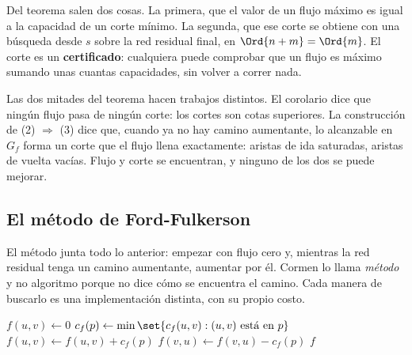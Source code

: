 \documentclass[11pt,letterpaper]{article}
\begin{document}
Del teorema salen dos cosas. La primera, que el valor de un flujo
máximo es igual a la capacidad de un corte mínimo. La segunda, que ese
corte se obtiene con una búsqueda desde $s$ sobre la red residual
final, en $\Ord{n + m} = \Ord{m}$. El corte es un
\textbf{certificado}: cualquiera puede comprobar que un flujo es
máximo sumando unas cuantas capacidades, sin volver a correr nada.

\begin{idea}
  Las dos mitades del teorema hacen trabajos distintos. El corolario
  dice que ningún flujo pasa de ningún corte: los cortes son cotas
  superiores. La construcción de (2) $\Rightarrow$ (3) dice que,
  cuando ya no hay camino aumentante, lo alcanzable en $G_f$ forma un
  corte que el flujo llena exactamente: aristas de ida saturadas,
  aristas de vuelta vacías. Flujo y corte se encuentran, y ninguno de
  los dos se puede mejorar.
\end{idea}


\subsection*{El método de Ford-Fulkerson}

El método junta todo lo anterior: empezar con flujo cero y, mientras
la red residual tenga un camino aumentante, aumentar por él. Cormen lo
llama \emph{método} y no algoritmo porque no dice cómo se encuentra el
camino. Cada manera de buscarlo es una implementación distinta, con su
propio costo.

\begin{algorithm}[H]
\caption{\textsc{Ford-Fulkerson}$(G, s, t)$}
\label{alg:ford-fulkerson}
\begin{algorithmic}[1]
    \State $f(u, v) \gets 0$
  \EndFor
    \State $c_f(p) \gets \min\set{c_f(u, v) : (u, v) \text{ está en }
           p}$
        \State $f(u, v) \gets f(u, v) + c_f(p)$
      \Else
        \State $f(v, u) \gets f(v, u) - c_f(p)$
      \EndIf
    \EndFor
  \EndWhile
  \State \Return $f$
\EndProcedure
\end{algorithmic}
\end{algorithm}
\end{document}
